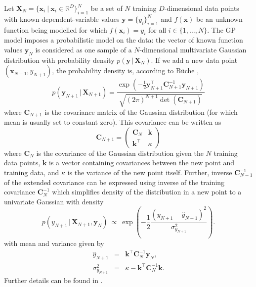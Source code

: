 \documentclass{itatnew}
\newcommand{\xx}{\mathrm{\mathbf{x}}}
\newcommand{\yy}{\mathrm{\mathbf{y}}}
\newcommand{\XX}{\mathrm{\mathbf{X}}}
\newcommand{\CC}{\mathrm{\mathbf{C}}}
\begin{document}
Let $\XX_N = \{\xx_i \ | \ \xx_i \in \mathbb{R}^{D}\}_{i=1}^{N}$ be a set of $N$ training $D$-dimensional data points with known dependent-variable values $\yy = \{y_i\}_{i=1}^{N}$ and $f(\xx)$ be an unknown function being modelled for which $f(\xx_i) = y_i$ for all $i \in \{1,\ldots,N\}$. The GP model imposes a probabilistic model on the data: the vector of known function values $\yy_N$ is considered as one sample of a $N$-dimensional multivariate Gaussian distribution with probability density $p(\yy \, | \, \XX_N)$. If we add a new data point $(\xx_{N+1}, y_{N+1})$, the probability density is, according to B\"{u}che \cite{buche_accelerating_2005},
\begin{equation}
p(\yy_{N+1} \, | \, \XX_{N+1}) = \frac { \exp(-\frac{1}{2} \yy^\top_{N+1} \CC^{-1}_{N+1} \yy_{N+1}) } { \sqrt{(2\pi)^{N+1} \det(\CC_{N+1})} }
\end{equation}
where $\CC_{N+1}$ is the covariance matrix of the Gaussian distribution (for which mean is usually set to constant zero). This covariance can be written as
\begin{equation}
\CC_{N+1} = \left( \begin{array}{cc} \CC_N & \mathbf{k} \\ \mathbf{k}^\top & \kappa \end{array} \right)
\end{equation}
where $\CC_N$ is the covariance of the Gaussian distribution given the $N$ training data points, $\mathbf{k}$ is a vector containing covariances between the new point and training data, and $\kappa$ is the variance of the new point itself. Further, inverse $\CC^{-1}_{N-1}$ of the extended covariance can be expressed using inverse of the training covariance $\CC^{-1}_N$ which simplifies density of the distribution in a new point to a univariate Gaussian with density
\begin{equation}
p(y_{N+1} \, | \, \XX_{N+1}, \yy_N) \ \varpropto \ \exp \left( -\frac{1}{2} \frac {(y_{N+1} - \hat{y}_{N+1})^2} {\sigma^2_{y_{N+1}}} \right)
\label{univariate-density}.
\end{equation}
with mean and variance given by
\begin{eqnarray}
\hat{y}_{N+1} & = & \mathbf{k}^\top \CC^{-1}_N \yy_N, \\
\sigma^2_{y_{N+1}} & = & \kappa - \mathbf{k}^\top \CC^{-1}_N \mathbf{k}.
\end{eqnarray}
Further details can be found in \cite{buche_accelerating_2005}.
\end{document}
